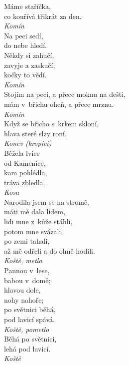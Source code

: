 \begin{multicols}{3}
\noindent
Máme staříčka,\\
co kouřívá třikrát za den.\\[1 mm]
{\sl Komín}\\

\noindent
Na peci sedí,\\
do nebe hledí.\\
Někdy si zahučí,\\
zavyje a zaskučí,\\
kočky to vědí.\\[1 mm]
{\sl Komín}\\

\noindent
Stojím na peci, a přece moknu na dešti,\\
mám v~břichu oheň, a přece mrznu.\\[1 mm]
{\sl Komín}\\

\noindent
Když se břicho s~krkem skloní,\\
hlava steré slzy roní.\\[1 mm]
{\sl Konev (kropící)}\\

\noindent
Běžela lvice\\
od Kamenice,\\
kam pohlédla,\\
tráva zbledla.\\[1 mm]
{\sl Kosa}\\

\noindent
Narodila jsem se na stromě,\\
máti mě dala lidem,\\
lidi mne z~kůže stáhli,\\
potom mne svázali,\\
po zemi tahali,\\
až mě odřeli a do ohně hodili.\\[1 mm]
{\sl Koště, metla}\\

\noindent
Pannou v~lese,\\
babou v~domě;\\
hlavou dole,\\
nohy nahoře;\\
po světnici běhá,\\
pod lavicí spává.\\[1 mm]
{\sl Koště, pometlo}\\

\noindent
Běhá po světnici,\\
lehá pod lavicí.\\[1 mm]
{\sl Koště}\\


\end{multicols}
